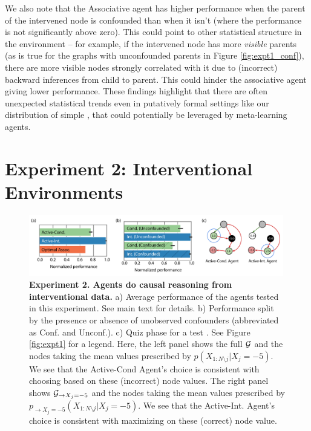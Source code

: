  
We also note that the Associative agent has higher performance when the parent of the intervened node is confounded than when it isn't (where the performance is not significantly above zero). This could point to other statistical structure in the environment -- for example, if the intervened node has more \textit{visible} parents (as is true for the graphs with unconfounded parents in Figure \ref{fig:expt1_conf}), there are more visible nodes strongly correlated with it due to (incorrect) backward inferences from child to parent. This could hinder the associative agent giving lower performance. These findings highlight that there are often unexpected statistical trends even in putatively formal settings like our distribution of simple \CBNs, that could potentially be leveraged \citep{janzing2009telling, hoyer2009nonlinear} by meta-learning agents.

\section{Experiment 2: Interventional Environments}
\label{sec:expt2}


\begin{figure}[t!]
\centering
   \includegraphics[width=0.99\textwidth, trim = {0 0cm 0 0.7cm}]{figures/fig_expt2.pdf}
    \caption{\textbf{Experiment 2. Agents do causal reasoning from interventional data.} a) Average performance of the agents tested in this experiment. See main text for details. b) Performance split by the presence or absence of unobserved confounders (abbreviated as Conf. and Unconf.). c) Quiz phase for a test \CBN. See Figure \ref{fig:expt1} for a legend. Here, the left panel shows the full $\cal G$ and the nodes taking the mean values prescribed by $p(X_{1:N\setminus j }|X_j=-5)$.
    We see that the Active-Cond Agent's choice is consistent with choosing based on these (incorrect) node values. The right panel shows ${\cal G}_{\rightarrow X_j=-5}$ and the nodes taking the mean values prescribed by $p_{\rightarrow X_j=-5}(X_{1:N\setminus j }|X_j=-5)$. We see that the Active-Int. Agent's choice is consistent with maximizing on these (correct) node value.}%
    \label{fig:expt2}%
\end{figure}

